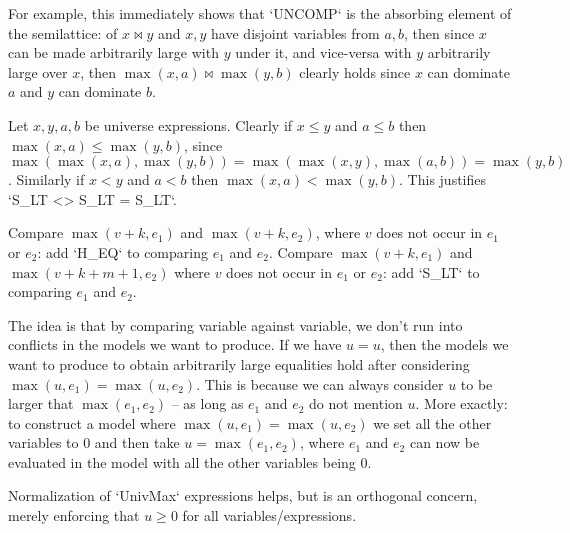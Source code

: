 \documentclass[11pt, twoside, reqno]{book}
\begin{document}
For example, this immediately shows that \inHS`UNCOMP` is the absorbing element of the semilattice: of \(x \bowtie y\) and \(x, y\) have disjoint variables from \(a, b\), then since \(x\) can be made arbitrarily large with \(y\) under it, and vice-versa with \(y\) arbitrarily large over \(x\), then \(\max(x, a) \bowtie \max(y, b)\) clearly holds since \(x\) can dominate \(a\) and \(y\) can dominate \(b\).

\iffalse
There is something weird happening here: comparing variable-wise is the only way to get the right answer, it certainly works, but doesn't fit into as nice of a framework.
In particular, we cannot prove that \(x \bowtie y\) and \(a \bowtie b\) implies \(\max(x,a) \bowtie \max(y,b)\) because maybe the correct thing to do was to compare \(x\) with \(b\) and \(a\) with \(y\).
It's like we need to make a good-will best-effort attempt to extract information.
Is it the minimum of all possible comparisons?
Or just the non-uncomparable?
Idk.
Anyways.
\fi

Let \(x, y, a, b\) be universe expressions.
Clearly if \(x \le y\) and \(a \le b\) then \(\max(x,a) \le \max(y,b)\), since \(\max(\max(x,a),\max(y,b)) = \max(\max(x,y),\max(a,b)) = \max(y,b)\).
Similarly if \(x < y\) and \(a < b\) then \(\max(x,a) < \max(y,b)\).
This justifies \inHS`S_LT <> S_LT = S_LT`.

Compare \(\max(v+k, e_1)\) and \(\max(v+k, e_2)\), where \(v\) does not occur in \(e_1\) or \(e_2\): add \inHS`H_EQ` to comparing \(e_1\) and \(e_2\).
Compare \(\max(v+k, e_1)\) and \(\max(v+k+m+1, e_2)\)  where \(v\) does not occur in \(e_1\) or \(e_2\): add \inHS`S_LT` to comparing \(e_1\) and \(e_2\).


The idea is that by comparing variable against variable, we don't run into conflicts in the models we want to produce.
If we have \(u = u\), then the models we want to produce to obtain arbitrarily large equalities hold after considering \(\max(u, e_1) = \max(u, e_2)\).
This is because we can always consider \(u\) to be larger that \(\max(e_1, e_2)\) -- as long as \(e_1\) and \(e_2\) do not mention \(u\).
More exactly: to construct a model where \(\max(u, e_1) = \max(u, e_2)\) we set all the other variables to \(0\) and then take \(u = \max(e_1, e_2)\), where \(e_1\) and \(e_2\) can now be evaluated in the model with all the other variables being \(0\).

\begin{mdframed}[style=Note]
Normalization of \inHS`UnivMax` expressions helps, but is an orthogonal concern, merely enforcing that \(u \ge 0\) for all variables/expressions.
\end{mdframed}
\end{document}
